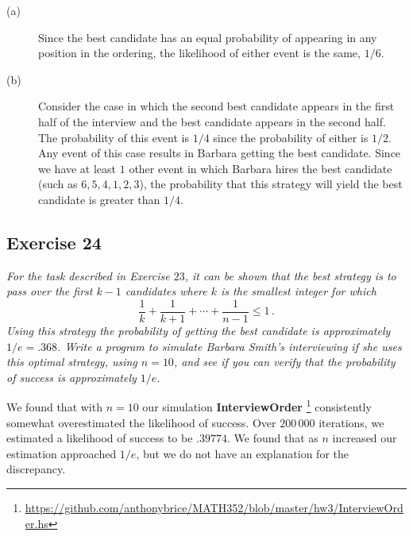 \documentclass{tufte-handout}
\begin{document}
\begin{description}
\item[\rm (a)] Since the best candidate has an equal probability of
  appearing in any position in the ordering, the likelihood of either
  event is the same, $1/6$.
\item[\rm (b)] Consider the case in which the second best candidate
  appears in the first half of the interview and the best candidate
  appears in the second half. The probability of this event is $1/4$
  since the probability of either is $1/2$. Any event of this case
  results in Barbara getting the best candidate. Since we have at
  least $1$ other event in which Barbara hires the best candidate
  (such as $6,5,4,1,2,3$), the probability that this strategy will
  yield the best candidate is greater than $1/4$.
\end{description}

\subsection{Exercise 24}
\begin{description}
\item \emph{For the task described in Exercise $23$, it can be shown
    that the best strategy is to pass over the first $k-1$ candidates
    where $k$ is the smallest integer for which}
  \[\frac{1}{k} + \frac{1}{k+1} + \cdots + \frac{1}{n-1} \leq 1 \, .\]
  \emph{Using this strategy the probability of getting the best
    candidate is approximately $1/e = .368$. Write a program to
    simulate Barbara Smith's interviewing if she uses this optimal
    strategy, using $n=10$, and see if you can verify that the
    probability of success is approximately $1/e$.}
\end{description}

We found that with $n = 10$ our simulation \textbf{InterviewOrder}%
\footnote{\url{https://github.com/anthonybrice/MATH352/blob/master/hw3/InterviewOrder.hs}}
consistently somewhat overestimated the likelihood of
success. Over $200\,000$ iterations, we estimated a likelihood of
success to be $.39774$. We found that as $n$ increased our estimation
approached $1/e$, but we do not have an explanation for the discrepancy.
\end{document}
